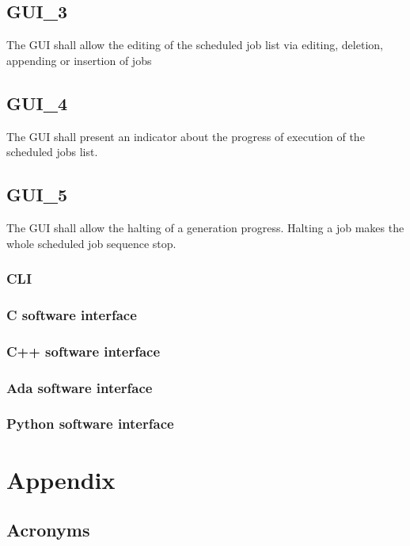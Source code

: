 \documentclass{scrreprt}
\begin{document}
\section{GUI\_3}
The GUI shall allow the editing of the scheduled job list via editing, deletion, appending or insertion of jobs
\section{GUI\_4}
The GUI shall present an indicator about the progress of execution of the scheduled jobs list.
\section{GUI\_5}
The GUI shall allow the halting of a generation progress. Halting a job makes the whole scheduled job sequence stop.

\subsection{CLI}
\subsection{C software interface}
\subsection{C++ software interface}
\subsection{Ada software interface}
\subsection{Python software interface}
\chapter{Appendix}
\section{Acronyms}
\end{document}
